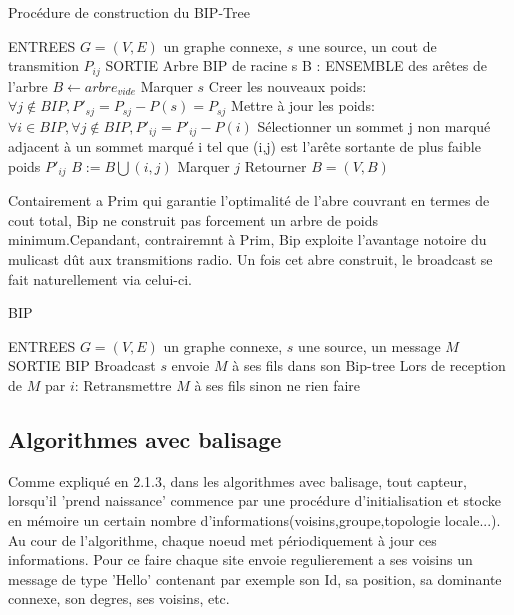 \begin{algorithm}[h]
\caption{Procédure de construction du BIP-Tree}
\label{algo_BIP_tree}
\begin{algorithmic}
\STATE ENTREES  $G=(V,E)$ un graphe connexe, $s$ une source, un cout de transmition $P_{ij}$
\STATE SORTIE  Arbre BIP de racine s
\STATE B : ENSEMBLE des arêtes de l'arbre
\STATE  $B \leftarrow arbre_{vide}$
\STATE Marquer $s$
\STATE Creer les nouveaux poids: $\forall j \notin BIP, P'_{sj}=P_{sj}-P(s)=P_{sj}$
   \STATE Mettre à jour les poids:  $ \forall i \in BIP, \forall j \notin BIP, P'_{ij}=P'_{ij}-P(i)$
   \STATE Sélectionner un sommet j non marqué adjacent à un sommet marqué i tel que (i,j) est l'arête sortante de plus faible poids $P'_{ij}$
   \STATE $B := B\bigcup   {(i,j)}$
   \STATE Marquer $j$
\ENDWHILE
\STATE Retourner $B=(V,B)$
\end{algorithmic}
\end{algorithm}

Contairement a Prim qui garantie l'optimalité de l'abre couvrant en termes de cout total,
Bip ne construit pas forcement un arbre de poids minimum.Cepandant, contrairemnt à Prim, Bip exploite l'avantage notoire du mulicast dût aux transmitions radio. Un fois cet abre construit, le broadcast se fait naturellement via celui-ci.

\begin{algorithm}[h]
\caption{BIP}
\label{algo_BIP}
\begin{algorithmic}
\STATE ENTREES  $G=(V,E)$ un graphe connexe, $s$ une source, un message $M$
\STATE SORTIE  BIP Broadcast
\STATE $s$ envoie $M$ à ses fils dans son Bip-tree
\STATE Lors de reception de $M$ par $i$:
    \STATE Retransmettre $M$ à ses fils sinon ne rien faire
\ENDIF
\end{algorithmic}
\end{algorithm}


\subsection{Algorithmes avec balisage}
Comme expliqué en 2.1.3, dans les algorithmes avec balisage, tout capteur, lorsqu'il 'prend naissance' commence par une procédure d'initialisation et stocke en 
mémoire un certain nombre d'informations(voisins,groupe,topologie locale...). Au cour de l'algorithme, chaque noeud met périodiquement à jour ces informations. Pour ce faire chaque site envoie regulierement a ses voisins un message de type
'Hello' contenant par exemple son Id, sa position, sa dominante connexe, son degres, ses voisins, etc.\\

